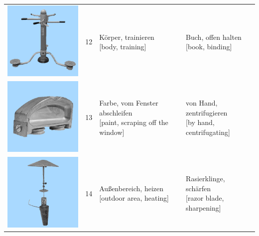 \documentclass[
  english,
  man,floatsintext]{apa7}
\begin{document}
\begin{center}
\begin{ThreePartTable}
{\begin{longtable}{llll}
\includegraphics[valign=c, scale=0.23]{../materials/unfamiliar/12.png} & 12 & \makecell[l]{Körper, trainieren\\{[body, training]}} & \makecell[l]{Buch, offen halten\\{[book, binding]}}\\
\includegraphics[valign=c, scale=0.23]{../materials/unfamiliar/13.png} & 13 & \makecell[l]{Farbe, vom Fenster abschleifen\\{[paint, scraping off the window]}} & \makecell[l]{von Hand, zentrifugieren\\{[by hand, centrifugating]}}\\
\includegraphics[valign=c, scale=0.23]{../materials/unfamiliar/14.png} & 14 & \makecell[l]{Außenbereich, heizen\\{[outdoor area, heating]}} & \makecell[l]{Rasierklinge, schärfen\\{[razor blade, sharpening]}}\\

\end{longtable}}
\end{ThreePartTable}
\end{center}
\end{document}
